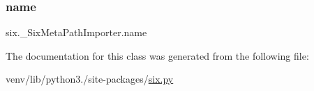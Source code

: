 \subsubsection{\texorpdfstring{name}{name}}
{\footnotesize\ttfamily six.\+\_\+\+Six\+Meta\+Path\+Importer.\+name}



The documentation for this class was generated from the following file\+:\begin{DoxyCompactItemize}
\item 
venv/lib/python3./site-\/packages/\hyperlink{six_8py}{six.\+py}\end{DoxyCompactItemize}
